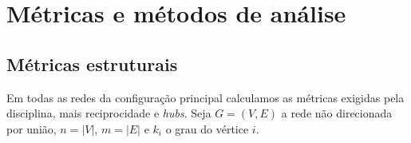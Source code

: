\section{Métricas e métodos de análise}\label{sec:metodos}

\subsection{Métricas estruturais}\label{sec:met-estruturais}

Em todas as redes da configuração principal calculamos as métricas exigidas pela disciplina,
mais reciprocidade e \emph{hubs}. Seja $G=(V,E)$ a rede não direcionada por união, $n=|V|$,
$m=|E|$ e $k_i$ o grau do vértice $i$.
